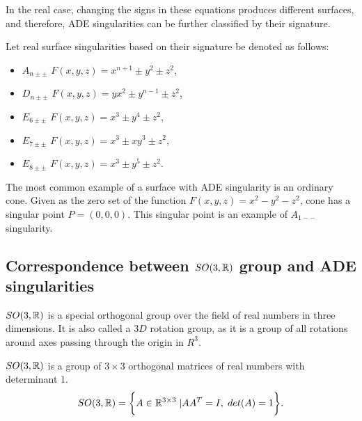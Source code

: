In the real case, changing the signs in these equations produces different
surfaces, and therefore, ADE singularities can be further classified by their
signature.

\begin{definition}
    Let real surface singularities based on their signature be denoted as follows:
    \begin{itemize}
        \item $A_{n\pm\pm}$ \hspace{5mm} $F(x,y,z)=x^{n+1}\pm y^2\pm z^2$,
              
        \item $D_{n\pm\pm}$ \hspace{5mm} $F(x,y,z)=yx^2\pm y^{n-1}\pm z^2$,
        
        \item $E_{6\pm\pm}$ \hspace{5mm} $F(x,y,z)=x^3\pm y^4\pm z^2$,
        
        \item $E_{7\pm\pm}$ \hspace{5mm} $F(x,y,z)=x^3\pm xy^3\pm z^2$,
        
        \item $E_{8\pm\pm}$ \hspace{5mm} $F(x,y,z)=x^3\pm y^5\pm z^2$.
        \end{itemize}
\end{definition}

The most common example of a surface with ADE singularity is an ordinary cone.
Given as the zero set of the function $F(x, y, z)=x^2-y^2-z^2$, cone has
a singular point $P=(0, 0, 0)$. This singular point is an example of $A_{1--}$
singularity.

\subsection{Correspondence between $SO(3,\mathbb{R})$ group and ADE singularities}
\label{subs2.2.2}
$SO(3, \mathbb{R})$ is a special orthogonal group over the field of real numbers 
in three dimensions. It is also called a $3D$ rotation group, as it is a group
of all rotations around axes passing through the origin in $R^3$.
\begin{definition}
    $SO(3, \mathbb{R})$ is a group of $3\times3$ orthogonal matrices
    of real numbers with determinant $1$.
    $$SO(3, \mathbb{R}) = \bigg\{A\in\mathbb{R}^{3\times3} \hspace{1mm} | AA^T=I ,\hspace{1mm} det(A)=1\bigg\}.$$
\end{definition}

